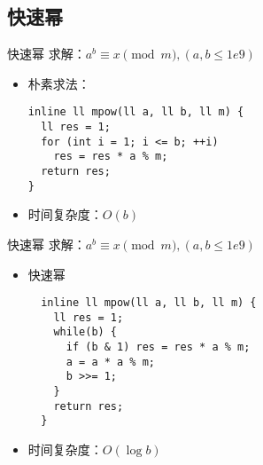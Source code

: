 \subsection{快速幂}
\begin{frame}[fragile]{快速幂}
  求解：$a^b\equiv x\pmod{m},(a,b\leq 1e9)$
  \vspace{0.5cm}
  \pause
\begin{itemize}
  \item 朴素求法：
\begin{lstlisting}
inline ll mpow(ll a, ll b, ll m) {
  ll res = 1;
  for (int i = 1; i <= b; ++i) 
    res = res * a % m;
  return res;
}
\end{lstlisting}
  \item 时间复杂度：$O(b)$
\end{itemize}
\end{frame}


\begin{frame}[fragile]{快速幂}
  求解：$a^b\equiv x\pmod{m},(a,b\leq 1e9)$
  \vspace{0.5cm}
\begin{itemize}
  \item 快速幂
\begin{lstlisting}
  inline ll mpow(ll a, ll b, ll m) {
    ll res = 1;
    while(b) {
      if (b & 1) res = res * a % m;
      a = a * a % m;
      b >>= 1;
    }
    return res;
  }
\end{lstlisting}
  \item 时间复杂度：$O(\log{b})$
\end{itemize}
\end{frame}